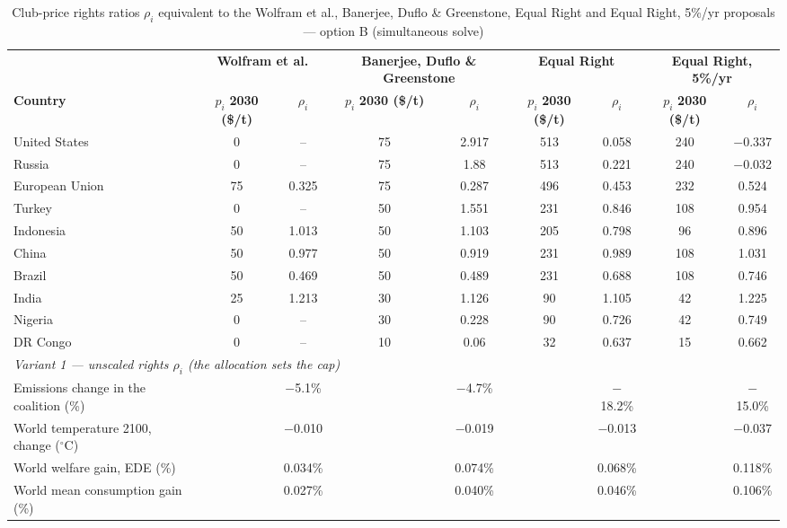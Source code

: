 \begin{table}[htbp]
\centering
\small
\caption{Club-price rights ratios $\rho_i$ equivalent to the Wolfram et al., Banerjee, Duflo \& Greenstone, Equal Right and Equal Right, 5\%/yr proposals --- option B (simultaneous solve)}
\renewcommand{\arraystretch}{1.15}
\begin{tabular}{lcccccccc}
  \toprule
  & \multicolumn{2}{c}{\textbf{Wolfram et al.}} & \multicolumn{2}{c}{\textbf{Banerjee, Duflo \& Greenstone}} & \multicolumn{2}{c}{\textbf{Equal Right}} & \multicolumn{2}{c}{\textbf{Equal Right, 5\%/yr}} \\
  \cmidrule(lr){2-3} \cmidrule(lr){4-5} \cmidrule(lr){6-7} \cmidrule(lr){8-9}
  \textbf{Country} & $p_i$ \textbf{2030 (\$/t)} & $\rho_i$ & $p_i$ \textbf{2030 (\$/t)} & $\rho_i$ & $p_i$ \textbf{2030 (\$/t)} & $\rho_i$ & $p_i$ \textbf{2030 (\$/t)} & $\rho_i$ \\
  \midrule
  United States & 0 & -- & 75 & 2.917 & 513 & 0.058 & 240 & $-$0.337 \\
  Russia & 0 & -- & 75 & 1.88 & 513 & 0.221 & 240 & $-$0.032 \\
  European Union & 75 & 0.325 & 75 & 0.287 & 496 & 0.453 & 232 & 0.524 \\
  Turkey & 0 & -- & 50 & 1.551 & 231 & 0.846 & 108 & 0.954 \\
  Indonesia & 50 & 1.013 & 50 & 1.103 & 205 & 0.798 & 96 & 0.896 \\
  China & 50 & 0.977 & 50 & 0.919 & 231 & 0.989 & 108 & 1.031 \\
  Brazil & 50 & 0.469 & 50 & 0.489 & 231 & 0.688 & 108 & 0.746 \\
  India & 25 & 1.213 & 30 & 1.126 & 90 & 1.105 & 42 & 1.225 \\
  Nigeria & 0 & -- & 30 & 0.228 & 90 & 0.726 & 42 & 0.749 \\
  DR Congo & 0 & -- & 10 & 0.06 & 32 & 0.637 & 15 & 0.662 \\
  \midrule
  \multicolumn{9}{l}{\textit{Variant 1 --- unscaled rights $\rho_i$ (the allocation sets the cap)}} \\
  \quad Emissions change in the coalition (\%) &  & $-$5.1\% &  & $-$4.7\% &  & $-$18.2\% &  & $-$15.0\% \\
  \quad World temperature 2100, change ($^\circ$C) &  & $-$0.010 &  & $-$0.019 &  & $-$0.013 &  & $-$0.037 \\
  \quad World welfare gain, EDE (\%) &  & 0.034\% &  & 0.074\% &  & 0.068\% &  & 0.118\% \\
  \quad World mean consumption gain (\%) &  & 0.027\% &  & 0.040\% &  & 0.046\% &  & 0.106\% \\

\end{tabular}
\end{table}
